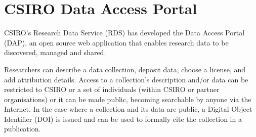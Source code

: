 \documentclass{llncs}
\begin{document}



\section{CSIRO Data Access Portal}
CSIRO's Research Data Service (RDS) has developed the Data Access Portal (DAP),
an open source web application that enables research data to be discovered,
managed and shared. \cite{DAP}

Researchers can describe a data collection, deposit data, choose a license, and
add attribution details. Access to a collection's description and/or data can be
restricted to CSIRO or a set of individuals (within CSIRO or partner
organisations) or it can be made public, becoming searchable by anyone via the
Internet. In the case where a collection and its data are public, a Digital
Object Identifier (DOI) is issued and can be used to formally cite the
collection in a publication. 

\end{document}
